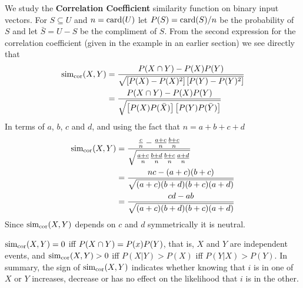 \documentclass{article}
\begin{document}
\begin{example} We study the \textbf{Correlation Coefficient} similarity
function on binary input vectors. For $S\subseteq U$ and $n=\operatorname{card}(U)$ let
$P(S)=\operatorname{card}(S)/n$ be the probability of $S$ and let $\bar{S}=U-S$ be the
compliment of $S$. From the second expression for
the correlation coefficient (given in the example in an earlier section) we see
directly that
\begin{equation}
\begin{split}
\operatorname{sim_{cor}}(X,Y) &= \frac{P(X\cap Y) - P(X)P(Y)}{\sqrt{\left[P(X)-P(X)^2\right]\left[P(Y)-P(Y)^2\right]}}\\
&=\frac{P(X\cap Y) - P(X)P(Y)}{\sqrt{\left[P(X)P(\bar{X})\right]\left[P(Y)P(\bar{Y})\right]}}
\end{split}
\end{equation}
In terms of $a$, $b$, $c$ and $d$, and using the fact that $n=a+b+c+d$
\begin{equation}
\begin{split}
\operatorname{sim_{cor}}(X,Y) &= \frac{\frac{c}{n} -\frac{a+c}{n}\frac{b+c}{n}}{\sqrt{\frac{a+c}{n}\frac{b+d}{n}\frac{b+c}{n}\frac{a+d}{n}}}\\ 
&=\frac{nc - (a+c)(b+c)}{\sqrt{(a+c)(b+d)(b+c)(a+d)}}\\
&=\frac{cd-ab}{\sqrt{(a+c)(b+d)(b+c)(a+d)}}
\end{split}
\end{equation}
Since $\operatorname{sim_{cor}}(X,Y)$ depends on $c$ and $d$ symmetrically it is neutral.

$\operatorname{sim_{cor}}(X,Y)=0$ iff  $P(X\cap Y)=P(x)P(Y)$, that is, $X$ and $Y$ are
independent events, and $\operatorname{sim_{cor}}(X,Y)>0$ iff
$P(X|Y)>P(X)$ iff $P(Y|X)>P(Y)$. In summary, the sign of $\operatorname{sim_{cor}}(X,Y)$ indicates
whether knowing that $i$ is in one of $X$ or $Y$ increases, decrease or has no
effect on the likelihood that $i$ is in the other.
\end{example}
\end{document}
